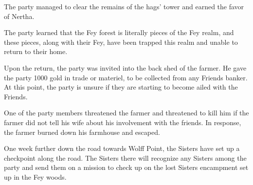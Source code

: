 The party managed to clear the remains of the hags' tower and earned the favor of Nertha.

The party learned that the Fey forest is literally pieces of the Fey realm, and these pieces, along with their Fey, have been trapped this realm and unable to return to their home.

Upon the return, the party was invited into the back shed of the farmer.
He gave the party 1000 gold in trade or materiel, to be collected from any Friends banker.
At this point, the party is unsure if they are starting to become ailed with the Friends.

One of the party members threatened the farmer and threatened to kill him if the farmer did not tell his wife about his involvement with the friends.
In response, the farmer burned down his farmhouse and escaped.

One week further down the road towards Wolff Point, the Sisters have set up a checkpoint along the road.
The Sisters there will recognize any Sisters among the party and send them on a mission to check up on the lost Sisters encampment set up in the Fey woods.
